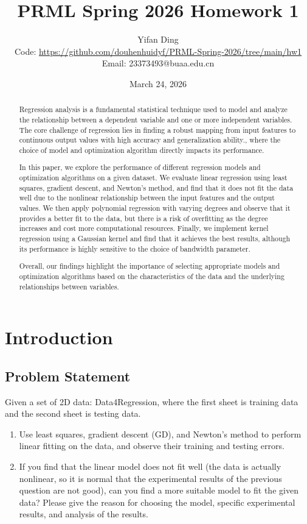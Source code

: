 \documentclass{article}
\title{PRML Spring 2026 Homework 1}
\author{Yifan Ding \\
        \small Code: \url{https://github.com/douhenhuidyf/PRML-Spring-2026/tree/main/hw1} \\
        \small Email: 23373493@buaa.edu.cn}
\date{March 24, 2026}
\begin{document}
\maketitle

\begin{abstract}
Regression analysis is a fundamental statistical technique used to model and analyze the relationship between a dependent variable and one or more independent variables.
The core challenge of regression lies in finding a robust mapping from input features to continuous output values with high accuracy and generalization ability.,
where the choice of model and optimization algorithm directly impacts its performance.

In this paper, we explore the performance of different regression models and optimization algorithms on a given dataset.
We evaluate linear regression using least squares, gradient descent, and Newton's method, and find that it does not fit the data well due to the nonlinear relationship between the input features and the output values. 
We then apply polynomial regression with varying degrees and observe that it provides a better fit to the data, but there is a risk of overfitting as the degree increases and cost more computational resources. 
Finally, we implement kernel regression using a Gaussian kernel and find that it achieves the best results, although its performance is highly sensitive to the choice of bandwidth parameter. 

Overall, our findings highlight the importance of selecting appropriate models and optimization algorithms based on the characteristics of the data and the underlying relationships between variables.
\end{abstract}


\section{Introduction}
\subsection{Problem Statement}
Given a set of 2D data: Data4Regression, where the first sheet is training data and the second sheet is testing data.
\begin{enumerate}
    \item Use least squares, gradient descent (GD), and Newton's method to perform linear fitting on the data,
     and observe their training and testing errors.
    \item If you find that the linear model does not fit well (the data is actually nonlinear,
     so it is normal that the experimental results of the previous question are not good),
      can you find a more suitable model to fit the given data?
    Please give the reason for choosing the model, specific experimental results, and analysis of the results.
\end{enumerate}
\end{document}
